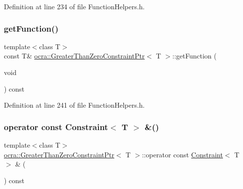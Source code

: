 Definition at line 234 of file Function\+Helpers.\+h.

\hypertarget{classocra_1_1GreaterThanZeroConstraintPtr_a582cf60ccca16e05849f356592d0efa2}{}\label{classocra_1_1GreaterThanZeroConstraintPtr_a582cf60ccca16e05849f356592d0efa2} 
\subsubsection{\texorpdfstring{get\+Function()}{getFunction()}\hspace{0.1cm}{\footnotesize\ttfamily [2/2]}}
{\footnotesize\ttfamily template$<$class T$>$ \\
const T\& \hyperlink{classocra_1_1GreaterThanZeroConstraintPtr}{ocra\+::\+Greater\+Than\+Zero\+Constraint\+Ptr}$<$ T $>$\+::get\+Function (\begin{DoxyParamCaption}\item[{void}]{ }\end{DoxyParamCaption}) const\hspace{0.3cm}{\ttfamily [inline]}}



Definition at line 241 of file Function\+Helpers.\+h.

\hypertarget{classocra_1_1GreaterThanZeroConstraintPtr_a3f9e5f168f83714aae4f725cdfadac67}{}\label{classocra_1_1GreaterThanZeroConstraintPtr_a3f9e5f168f83714aae4f725cdfadac67} 
\subsubsection{\texorpdfstring{operator const Constraint$<$ T $>$ \&()}{operator const Constraint< T > \&()}}
{\footnotesize\ttfamily template$<$class T$>$ \\
\hyperlink{classocra_1_1GreaterThanZeroConstraintPtr}{ocra\+::\+Greater\+Than\+Zero\+Constraint\+Ptr}$<$ T $>$\+::operator const \hyperlink{classocra_1_1Constraint}{Constraint}$<$ T $>$ \& (\begin{DoxyParamCaption}{ }\end{DoxyParamCaption}) const\hspace{0.3cm}{\ttfamily [inline]}}



